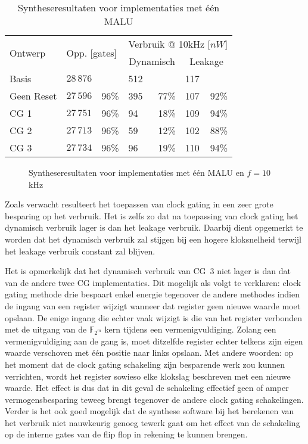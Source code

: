 \begin{table}[h]
	\caption{Syntheseresultaten voor implementaties met \'e\'en MALU}
	\label{tabel-resultaten-optimalisaties}

	\centering
	\begin{tabular}{llrlrlr}
		\toprule
		\multirow{2}{*}{Ontwerp}	& \multicolumn{2}{l}{\multirow{2}{*}{Opp. [gates]}}	& \multicolumn{4}{c}{Verbruik @ 10kHz [$nW$]}\\
		\cmidrule{4-7}
		&	& & \multicolumn{2}{c}{Dynamisch}	& \multicolumn{2}{c}{Leakage}\\
		\midrule
		Basis			& $28\,876$	& 			& 512	&	 		& 117 & \\
		Geen Reset	& $27\,596$	& 96\%	& 395	& 77\%	& 107 & 92\%\\
		CG 1			& $27\,751$	& 96\%	& 94	& 18\%	& 109	& 94\%\\
		CG 2			& $27\,713$	& 96\%	& 59	& 12\%	& 102	& 88\%\\
		CG 3			& $27\,734$	& 96\%	& 96	& 19\%	& 110	& 94\%\\
		\bottomrule		
	\end{tabular}
\end{table}

\begin{figure}[h]
	\centering
		\caption{Syntheseresultaten voor implementaties met \'e\'en MALU en $f = 10$kHz\label{figuur-resultaten-m1}}
\end{figure}

Zoals verwacht resulteert het toepassen van clock gating in een zeer grote besparing op het verbruik. Het is zelfs zo dat na toepassing van clock gating het dynamisch verbruik lager is dan het leakage verbruik. Daarbij dient opgemerkt te worden dat het dynamisch verbruik zal stijgen bij een hogere kloksnelheid terwijl het leakage verbruik constant zal blijven.

Het is opmerkelijk dat het dynamisch verbruik van CG~3 niet lager is dan dat van de andere twee CG implementaties. Dit mogelijk als volgt te verklaren: clock gating methode drie bespaart enkel energie tegenover de andere methodes indien de ingang van een register wijzigt wanneer dat register geen nieuwe waarde moet opslaan. De enige ingang die echter vaak wijzigt is die van het register verbonden met de uitgang van de $\mathbb{F}_{2^m}$ kern tijdens een vermenigvuldiging. Zolang een vermenigvuldiging aan de gang is, moet ditzelfde register echter telkens zijn eigen waarde verschoven met \'e\'en positie naar links opslaan. Met andere woorden: op het moment dat de clock gating schakeling zijn besparende werk zou kunnen verrichten, wordt het register sowieso elke klokslag beschreven met een nieuwe waarde. Het effect is dus dat in dit geval de schakeling effectief geen of amper vermogensbesparing teweeg brengt tegenover de andere clock gating schakelingen. Verder is het ook goed mogelijk dat de synthese software bij het berekenen van het verbruik niet nauwkeurig genoeg tewerk gaat om het effect van de schakeling op de interne gates van de flip flop in rekening te kunnen brengen.

